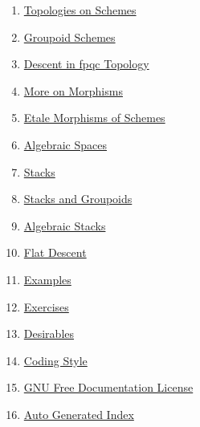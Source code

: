 \begin{multicols}{2}
\begin{enumerate}
\item \hyperref[topologies-section-phantom]{Topologies on Schemes}
\item \hyperref[groupoids-section-phantom]{Groupoid Schemes}
\item \hyperref[fpqc-descent-section-phantom]{Descent in fpqc Topology}
\item \hyperref[more-morphisms-section-phantom]{More on Morphisms}
\item \hyperref[etale-section-phantom]{Etale Morphisms of Schemes}
\item \hyperref[spaces-section-phantom]{Algebraic Spaces}
\item \hyperref[stacks-section-phantom]{Stacks}
\item \hyperref[stacks-groupoids-section-phantom]{Stacks and Groupoids}
\item \hyperref[algebraic-section-phantom]{Algebraic Stacks}
\item \hyperref[flat-section-phantom]{Flat Descent}
\item \hyperref[examples-section-phantom]{Examples}
\item \hyperref[exercises-section-phantom]{Exercises}
\item \hyperref[desirables-section-phantom]{Desirables}
\item \hyperref[coding-section-phantom]{Coding Style}
\item \hyperref[fdl-section-phantom]{GNU Free Documentation License}
\item \hyperref[index-section-phantom]{Auto Generated Index}
\end{enumerate}
\end{multicols}
